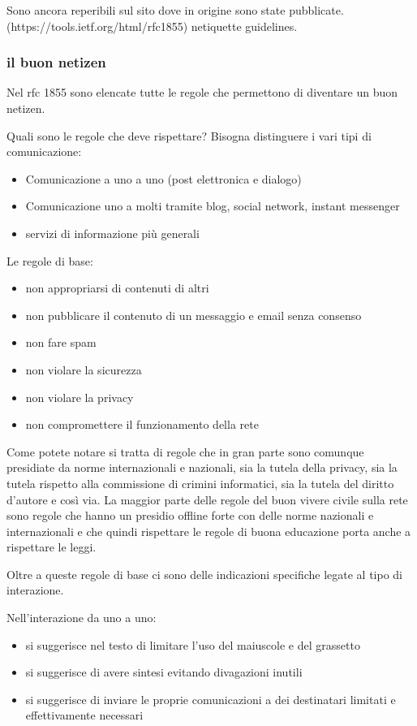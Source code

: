 Sono ancora reperibili sul sito dove in origine sono state pubblicate. (https://tools.ietf.org/html/rfc1855) netiquette guidelines.\par

\subsubsection{il buon netizen}

Nel rfc 1855 sono elencate tutte le regole che permettono di diventare un buon netizen.\par 
Quali sono le regole che deve rispettare? 
Bisogna distinguere i vari tipi di comunicazione:
\begin{itemize}
    \item Comunicazione a uno a uno (post elettronica e dialogo) 
    \item Comunicazione uno a molti tramite blog, social network, instant messenger 
    \item servizi di informazione più generali 
\end{itemize}

Le regole di base:
\begin{itemize}
    \item non appropriarsi di contenuti di altri 
    \item non pubblicare il contenuto di un messaggio e email senza consenso 
    \item non fare spam
    \item non violare la sicurezza
    \item non violare la privacy
    \item non compromettere il funzionamento della rete
\end{itemize}

Come potete notare si tratta di regole che in gran parte sono comunque presidiate da norme internazionali e nazionali, sia la tutela della privacy, sia la tutela rispetto alla commissione di crimini informatici, sia la tutela del diritto d'autore e così via. La maggior parte delle regole del buon vivere civile sulla rete sono regole che hanno un presidio offline forte con delle norme nazionali e internazionali e che quindi rispettare le regole di buona educazione porta anche a rispettare le leggi.\par 
Oltre a queste regole di base ci sono delle indicazioni specifiche legate al tipo di interazione. \par
Nell'interazione da uno a uno:
\begin{itemize}
    \item si suggerisce nel testo di limitare l'uso del maiuscole e del grassetto 
    \item si suggerisce di avere sintesi evitando divagazioni inutili 
    \item si suggerisce di inviare le proprie comunicazioni a dei destinatari limitati e effettivamente necessari 
\end{itemize}


